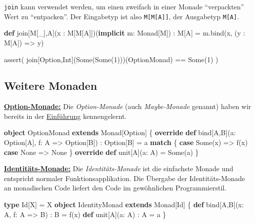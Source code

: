 \documentclass[]{article}
\newenvironment{Shaded}{}{}
\newcommand{\DataTypeTok}[1]{\textcolor[rgb]{0.56,0.13,0.00}{#1}}
\newcommand{\DecValTok}[1]{\textcolor[rgb]{0.25,0.63,0.44}{#1}}
\newcommand{\FunctionTok}[1]{\textcolor[rgb]{0.02,0.16,0.49}{#1}}
\newcommand{\KeywordTok}[1]{\textcolor[rgb]{0.00,0.44,0.13}{\textbf{#1}}}
\newcommand{\NormalTok}[1]{#1}
\begin{document}
\texttt{join} kann verwendet werden, um einen zweifach in einer Monade
``verpackten'' Wert zu ``entpacken''. Der Eingabetyp ist also
\texttt{M{[}M{[}A{]}{]}}, der Ausgabetyp \texttt{M{[}A{]}}.

\begin{Shaded}
\begin{Highlighting}[]
\KeywordTok{def}\NormalTok{ join[M[\_],A](x : M[M[A]])(}\KeywordTok{implicit}\NormalTok{ m: Monad[M]) : M[A] = }
\NormalTok{  m.}\FunctionTok{bind}\NormalTok{(x, (y : M[A]) =\textgreater{} y)}

\FunctionTok{assert}\NormalTok{( join[Option,Int](Some(Some(}\DecValTok{1}\NormalTok{)))(OptionMonad) == Some(}\DecValTok{1}\NormalTok{) )}
\end{Highlighting}
\end{Shaded}

\hypertarget{weitere-monaden}{%
\subsection{Weitere Monaden}\label{weitere-monaden}}

\underline{\textbf{Option-Monade:}} Die \emph{Option-Monade} (auch
\emph{Maybe-Monade} genannt) haben wir bereits in der
\protect\hyperlink{einfuxfchrung-mit-option-monade}{Einführung}
kennengelernt.

\begin{Shaded}
\begin{Highlighting}[]
\KeywordTok{object}\NormalTok{ OptionMonad }\KeywordTok{extends}\NormalTok{ Monad[Option] \{}
  \KeywordTok{override} \KeywordTok{def}\NormalTok{ bind[A,B](a: Option[A], f: A =\textgreater{} Option[B]) : Option[B] = a }\KeywordTok{match}\NormalTok{ \{}
    \KeywordTok{case}\NormalTok{ Some(x) =\textgreater{} }\FunctionTok{f}\NormalTok{(x)}
    \KeywordTok{case}\NormalTok{ None =\textgreater{} None}
\NormalTok{  \}}
  \KeywordTok{override} \KeywordTok{def} \DataTypeTok{unit}\NormalTok{[A](a: A) = Some(a)}
\NormalTok{\}   }
\end{Highlighting}
\end{Shaded}

\underline{\textbf{Identitäts-Monade:}} Die \emph{Identitäts-Monade} ist die
einfachste Monade und entspricht normaler Funktionsapplikation. Die
Übergabe der Identitäts-Monade an monadischen Code liefert den Code im
gewöhnlichen Programmierstil.

\begin{Shaded}
\begin{Highlighting}[]
\KeywordTok{type}\NormalTok{ Id[X] = X   }
\KeywordTok{object}\NormalTok{ IdentityMonad }\KeywordTok{extends}\NormalTok{ Monad[Id] \{}
  \KeywordTok{def}\NormalTok{ bind[A,B](x: A, f: A =\textgreater{} B) : B = }\FunctionTok{f}\NormalTok{(x) }
  \KeywordTok{def} \DataTypeTok{unit}\NormalTok{[A](a: A) : A = a}
\NormalTok{\}}
\end{Highlighting}
\end{Shaded}
\end{document}
